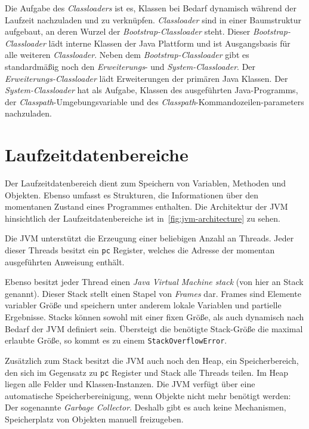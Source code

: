 Die Aufgabe des \textit{Classloaders} ist es, Klassen bei Bedarf dynamisch während der Laufzeit nachzuladen und zu verknüpfen. \textit{Classloader} sind in einer Baumstruktur aufgebaut, an deren Wurzel der \textit{Bootstrap-Classloader} steht. Dieser \textit{Bootstrap-Classloader} lädt interne Klassen der Java Plattform und ist Ausgangsbasis für alle weiteren \textit{Classloader}. Neben dem \textit{Bootstrap-Classloader} gibt es standardmäßig noch den \textit{Erweiterungs}- und \textit{System-Classloader}. Der \textit{Erweiterungs-Classloader} lädt Erweiterungen der primären Java Klassen. Der \textit{System-Classloader} hat als Aufgabe, Klassen des ausgeführten Java-Programms, der \textit{Classpath}-Umgebungsvariable und des \textit{Classpath}-Kommandozeilen\break-parameters nachzuladen.

\section{Laufzeitdatenbereiche}

Der Laufzeitdatenbereich dient zum Speichern von Variablen, Methoden und Objekten. Ebenso umfasst es Strukturen, die Informationen über den momentanen Zustand eines Programmes enthalten. Die Architektur der JVM hinsichtlich der Laufzeitdatenbereiche ist in~\autoref{fig:jvm-architecture} zu sehen.

Die JVM unterstützt die Erzeugung einer beliebigen Anzahl an Threads. Jeder dieser Threads besitzt ein \texttt{pc} Register, welches die Adresse der momentan ausgeführten Anweisung enthält.

Ebenso besitzt jeder Thread einen \textit{Java Virtual Machine stack} (von hier an Stack genannt). Dieser Stack stellt einen Stapel von \textit{Frames} dar. Frames sind Elemente variabler Größe und speichern unter anderem lokale Variablen und partielle Ergebnisse. Stacks können sowohl mit einer fixen Größe, als auch dynamisch nach Bedarf der JVM definiert sein. Übersteigt die benötigte Stack-Größe die maximal erlaubte Größe, so kommt es zu einem \texttt{StackOverflowError}.

Zusätzlich zum Stack besitzt die JVM auch noch den Heap, ein Speicherbereich, den sich im Gegensatz zu \texttt{pc} Register und Stack alle Threads teilen. Im Heap liegen alle Felder und Klassen-Instanzen. Die JVM verfügt über eine automatische Speicherbereinigung, wenn Objekte nicht mehr benötigt werden: Der sogenannte \textit{Garbage Collector}. Deshalb gibt es auch keine Mechanismen, Speicherplatz von Objekten manuell freizugeben.

